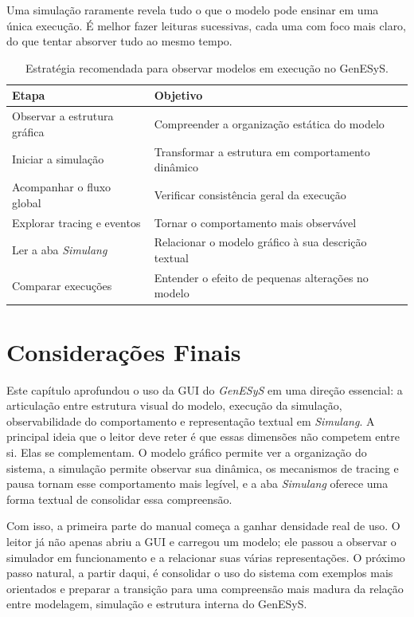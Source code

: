 Uma simulação raramente revela tudo o que o modelo pode ensinar em uma única execução. É melhor fazer leituras sucessivas, cada uma com foco mais claro, do que tentar absorver tudo ao mesmo tempo.

\begin{table}[htbp]
    \centering
    \caption{Estratégia recomendada para observar modelos em execução no GenESyS.}
    \label{tab:cap5_estrategia_observacao_execucao}
    \small
    \begin{tabular}{|p{4.3cm}|p{6.9cm}|}
        \hline
        \textbf{Etapa} & \textbf{Objetivo} \\
        \hline
        Observar a estrutura gráfica & Compreender a organização estática do modelo \\
        \hline
        Iniciar a simulação & Transformar a estrutura em comportamento dinâmico \\
        \hline
        Acompanhar o fluxo global & Verificar consistência geral da execução \\
        \hline
        Explorar tracing e eventos & Tornar o comportamento mais observável \\
        \hline
        Ler a aba \textit{Simulang} & Relacionar o modelo gráfico à sua descrição textual \\
        \hline
        Comparar execuções & Entender o efeito de pequenas alterações no modelo \\
        \hline
    \end{tabular}
\end{table}

\section{Considerações Finais}
\label{sec:cap5_consideracoes_finais}

Este capítulo aprofundou o uso da GUI do \textit{GenESyS} em uma direção essencial: a articulação entre estrutura visual do modelo, execução da simulação, observabilidade do comportamento e representação textual em \textit{Simulang}. A principal ideia que o leitor deve reter é que essas dimensões não competem entre si. Elas se complementam. O modelo gráfico permite ver a organização do sistema, a simulação permite observar sua dinâmica, os mecanismos de tracing e pausa tornam esse comportamento mais legível, e a aba \textit{Simulang} oferece uma forma textual de consolidar essa compreensão.

Com isso, a primeira parte do manual começa a ganhar densidade real de uso. O leitor já não apenas abriu a GUI e carregou um modelo; ele passou a observar o simulador em funcionamento e a relacionar suas várias representações. O próximo passo natural, a partir daqui, é consolidar o uso do sistema com exemplos mais orientados e preparar a transição para uma compreensão mais madura da relação entre modelagem, simulação e estrutura interna do GenESyS.

